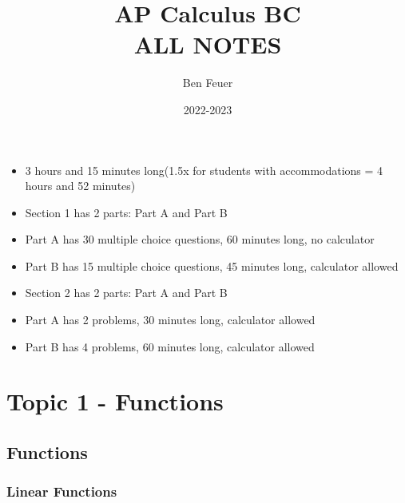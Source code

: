 \documentclass{report}
\title{\Huge{AP Calculus BC}\\ALL NOTES}
\author{\huge{Ben Feuer}}
\date{2022-2023}
\begin{document}
\maketitle
\newpage%
\tableofcontents
\pagebreak


\begin{itemize}
  \item 3 hours and 15 minutes long(1.5x for students with accommodations = 4 hours and 52 minutes)
  \item Section 1 has 2 parts: Part A and Part B 
  \item Part A has 30 multiple choice questions, 60 minutes long, no calculator 
  \item Part B has 15 multiple choice questions, 45 minutes long, calculator allowed 
  \item Section 2 has 2 parts: Part A and Part B 
  \item Part A has 2 problems, 30 minutes long, calculator allowed 
  \item Part B has 4 problems, 60 minutes long, calculator allowed
\end{itemize}

\chapter{Topic 1 - Functions}

\section{Functions}



\subsection{Linear Functions}
\end{document}
